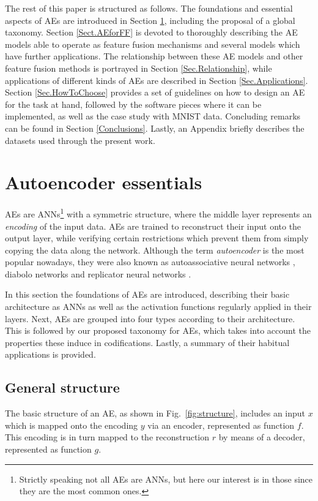     The rest of this paper is structured as follows. The foundations and essential aspects of AEs are introduced in Section \ref{Sec.Essentials}, including the proposal of a global taxonomy. Section \ref{Sect.AEforFF} is devoted to thoroughly describing the AE models able to operate as feature fusion mechanisms 
    and several models which have further applications. The relationship between these AE models and other feature fusion methods is portrayed in Section \ref{Sec.Relationship}, while applications of different kinds of AEs are described in Section \ref{Sec.Applications}. Section \ref{Sec.HowToChoose} provides a set of guidelines on how to design an AE for the task at hand, followed by the software pieces where it can be implemented, as well as the case study with MNIST data. Concluding remarks can be found in Section \ref{Conclusions}. Lastly, an Appendix briefly describes the datasets used through the present work.

\section{Autoencoder essentials}\label{Sec.Essentials} 


AEs are ANNs\footnote{Strictly speaking not all AEs are ANNs, but here our interest is in those since they are the most common ones.} with a symmetric structure, where the middle layer represents an \textit{encoding} of the input data. AEs are trained to reconstruct their input onto the output layer, while verifying certain restrictions which prevent them from simply copying the data along the network. Although the term \textit{autoencoder} is the most popular nowadays, they were also known as autoassociative neural networks \cite{AutoassociativeNN}, diabolo networks \cite{DiaboloNN} and replicator neural networks \cite{ReplicatorNN}.

In this section the foundations of AEs are introduced, describing their basic architecture as ANNs as well as the activation functions regularly applied in their layers. Next, AEs are grouped into four types according to their architecture. This is followed by our proposed taxonomy for AEs, which takes into account the properties these induce in codifications. Lastly, a summary of their habitual applications is provided.

\subsection{General structure}
The basic structure of an AE, as shown in Fig.~\ref{fig:structure}, includes an input $x$ which is mapped onto the encoding $y$ via an encoder, represented as function $f$. This encoding is in turn mapped to the reconstruction $r$ by means of a decoder, represented as function $g$.

